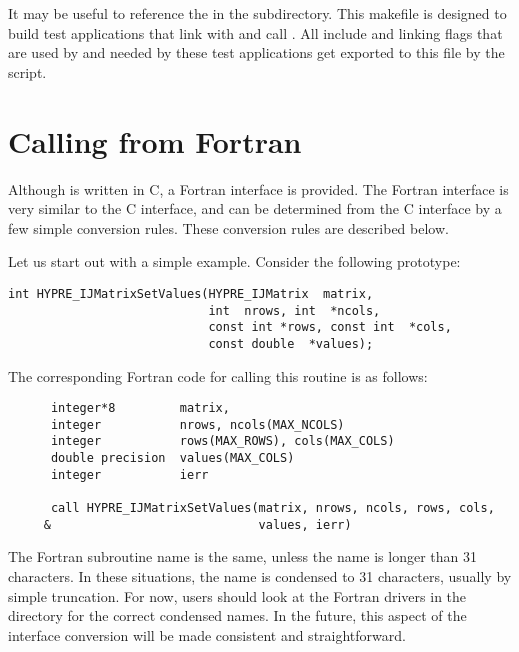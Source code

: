 It may be useful to reference the  in the 
subdirectory.  This makefile is designed to build test applications
that link with and call \hypre{}.  All include and linking flags that
are used by \hypre{} and needed by these test applications get
exported to this file by the  script.


\section{Calling \hypre{} from Fortran}
\label{Calling hypre from Fortran}

Although \hypre{} is written in C, a Fortran interface is provided.
The Fortran interface is very similar to the C interface, and can be
determined from the C interface by a few simple conversion rules.
These conversion rules are described below.

Let us start out with a simple example.  Consider the following
\hypre{} prototype:
\begin{display}
\begin{verbatim}
int HYPRE_IJMatrixSetValues(HYPRE_IJMatrix  matrix,
                            int  nrows, int  *ncols,
                            const int *rows, const int  *cols,
                            const double  *values);
\end{verbatim}
\end{display}
The corresponding Fortran code for calling this routine is as follows:
\begin{display}
\begin{verbatim}
      integer*8         matrix, 
      integer           nrows, ncols(MAX_NCOLS)
      integer           rows(MAX_ROWS), cols(MAX_COLS)
      double precision  values(MAX_COLS)
      integer           ierr

      call HYPRE_IJMatrixSetValues(matrix, nrows, ncols, rows, cols,
     &                             values, ierr)
\end{verbatim}
\end{display}
The Fortran subroutine name is the same, unless the name is longer
than 31 characters.  In these situations, the name is condensed to 31
characters, usually by simple truncation.  For now, users should look
at the Fortran drivers in the  directory for the correct
condensed names.  In the future, this aspect of the interface conversion
will be made consistent and straightforward.


